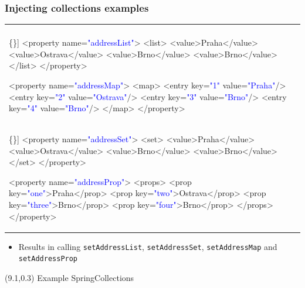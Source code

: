 \documentclass[10pt,xcolor=pdflatex, table]{beamer}
\begin{document}
\begin{frame}[fragile]\frametitle{Injecting collections examples}
	
	\begin{tabular}{p{5.5cm} p{5cm}}
    	\begin{Verbatim}[fontsize=\footnotesize, commandchars=\\\{\}]
<property name=\textcolor{blue}{"addressList"}>
<list>
  <value>Praha</value>
  <value>Ostrava</value>
  <value>Brno</value>
  <value>Brno</value>
</list>
</property>

<property name=\textcolor{blue}{"addressMap"}>
<map>
  <entry key=\textcolor{blue}{"1"} value=\textcolor{blue}{"Praha"}/>
  <entry key=\textcolor{blue}{"2"} value=\textcolor{blue}{"Ostrava"}/>
  <entry key=\textcolor{blue}{"3"} value=\textcolor{blue}{"Brno"}/>
  <entry key=\textcolor{blue}{"4"} value=\textcolor{blue}{"Brno"}/>
</map>
</property>
		\end{Verbatim}
    	&
    	\begin{Verbatim}[fontsize=\footnotesize, commandchars=\\\{\}]
<property name=\textcolor{blue}{"addressSet"}>
<set>
  <value>Praha</value>
  <value>Ostrava</value>
  <value>Brno</value>
  <value>Brno</value>
</set>
</property>

<property name=\textcolor{blue}{"addressProp"}>
<props>
  <prop key=\textcolor{blue}{"one"}>Praha</prop>
  <prop key=\textcolor{blue}{"two"}>Ostrava</prop>
  <prop key=\textcolor{blue}{"three"}>Brno</prop>
  <prop key=\textcolor{blue}{"four"}>Brno</prop>
</props>
</property>
		\end{Verbatim}
    \end{tabular}
    \begin{itemize}
    	\item {\footnotesize Results in calling \texttt{setAddressList}, \texttt{setAddressSet}, \texttt{setAddressMap} and \texttt{setAddressProp}}
    \end{itemize}
\begin{textblock}{15}(9.1,0.3)
    {\footnotesize Example SpringCollections}
\end{textblock}
\end{frame}
\end{document}
